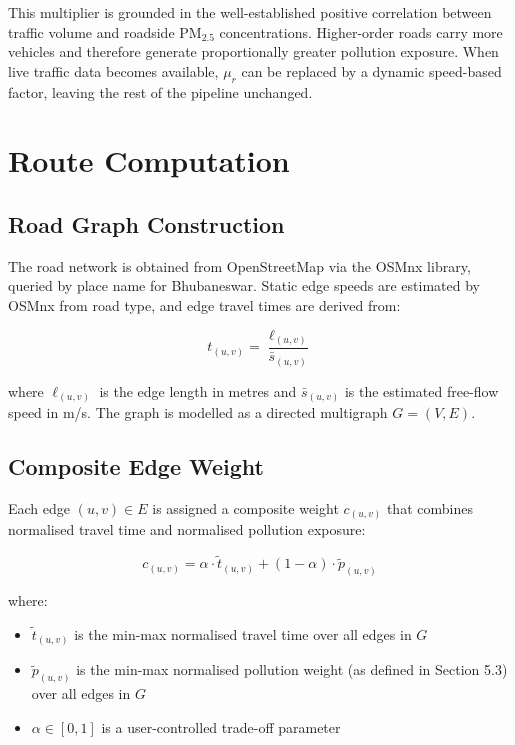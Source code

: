 \documentclass[12pt,a4paper]{article}
\begin{document}
This multiplier is grounded in the well-established positive correlation between traffic volume and roadside PM$_{2.5}$ concentrations. Higher-order roads carry more vehicles and therefore generate proportionally greater pollution exposure. When live traffic data becomes available, $\mu_r$ can be replaced by a dynamic speed-based factor, leaving the rest of the pipeline unchanged.

\section{Route Computation}

\subsection{Road Graph Construction}

The road network is obtained from OpenStreetMap via the OSMnx library, queried by place name for Bhubaneswar. Static edge speeds are estimated by OSMnx from road type, and edge travel times are derived from:

\[
  t_{(u,v)} = \frac{\ell_{(u,v)}}{\bar{s}_{(u,v)}}
\]

where $\ell_{(u,v)}$ is the edge length in metres and $\bar{s}_{(u,v)}$ is the estimated free-flow speed in m/s. The graph is modelled as a directed multigraph $G = (V, E)$.

\subsection{Composite Edge Weight}

Each edge $(u, v) \in E$ is assigned a composite weight $c_{(u,v)}$ that combines normalised travel time and normalised pollution exposure:

\[
  c_{(u,v)} = \alpha \cdot \tilde{t}_{(u,v)} + (1 - \alpha) \cdot \tilde{p}_{(u,v)}
\]

where:
\begin{itemize}
  \item $\tilde{t}_{(u,v)}$ is the min-max normalised travel time over all edges in $G$
  \item $\tilde{p}_{(u,v)}$ is the min-max normalised pollution weight (as defined in Section 5.3) over all edges in $G$
  \item $\alpha \in [0, 1]$ is a user-controlled trade-off parameter
\end{itemize}
\end{document}
